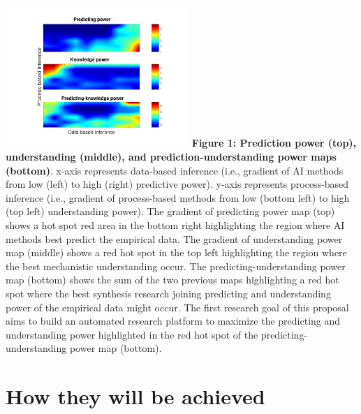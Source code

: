 \documentclass[12pt, a4paper]{article} %
\begin{document}
\hspace{-0.2 in}\includegraphics[width=0.52\textwidth]{Figures/Figure3.pdf}
{\small {\bf Figure 1: Prediction power (top), understanding (middle),
    and prediction-understanding power maps (bottom)}. x-axis
  represents data-based inference (i.e., gradient of AI methods from
  low (left) to high (right) predictive power). y-axis represents
  process-based inference (i.e., gradient of process-based methods
  from low (bottom left) to high (top left) understanding power). The
  gradient of predicting power map (top) shows a hot spot red area in
  the bottom right highlighting the region where AI methods best
  predict the empirical data. The gradient of understanding power map
  (middle) shows a red hot spot in the top left highlighting the
  region where the best mechanistic understanding occur. The
  predicting-understanding power map (bottom) shows the sum of the two
  previous maps highlighting a red hot spot where the best synthesis
  research joining predicting and understanding power of the empirical
  data might occur. The first research goal of this proposal aims to
  build an automated research platform to maximize the predicting and
  understanding power highlighted in the red hot spot of the
  predicting-understanding power map (bottom).}


\section{How they will be achieved}
\end{document}
